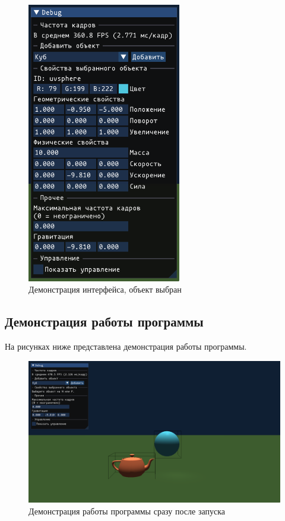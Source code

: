 \begin{figure}[H]
	\centering
	\includegraphics[width=0.6\textwidth]{img/demo-iobject.png}
	\caption{Демонстрация интерфейса, объект выбран}
	\label{fig:object}
\end{figure}

\subsection{Демонстрация работы программы}

На рисунках ниже представлена демонстрация работы программы.

\begin{figure}[H]
	\centering
	\includegraphics[width=\textwidth]{img/demo-start.png}
	\caption{Демонстрация работы программы сразу после запуска}
	\label{fig:start}
\end{figure}

